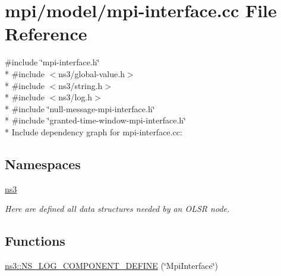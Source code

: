\hypertarget{mpi-interface_8cc}{}\section{mpi/model/mpi-\/interface.cc File Reference}
\label{mpi-interface_8cc}
{\ttfamily \#include \char`\"{}mpi-\/interface.\+h\char`\"{}}\\*
{\ttfamily \#include $<$ns3/global-\/value.\+h$>$}\\*
{\ttfamily \#include $<$ns3/string.\+h$>$}\\*
{\ttfamily \#include $<$ns3/log.\+h$>$}\\*
{\ttfamily \#include \char`\"{}null-\/message-\/mpi-\/interface.\+h\char`\"{}}\\*
{\ttfamily \#include \char`\"{}granted-\/time-\/window-\/mpi-\/interface.\+h\char`\"{}}\\*
Include dependency graph for mpi-\/interface.cc\+:
\subsection*{Namespaces}
\begin{DoxyCompactItemize}
\item 
 \hyperlink{namespacens3}{ns3}
\begin{DoxyCompactList}\small\item\em Here are defined all data structures needed by an O\+L\+SR node. \end{DoxyCompactList}\end{DoxyCompactItemize}
\subsection*{Functions}
\begin{DoxyCompactItemize}
\item 
\hyperlink{namespacens3_ac0ea8c5ee5f4cc923e252e3103122850}{ns3\+::\+N\+S\+\_\+\+L\+O\+G\+\_\+\+C\+O\+M\+P\+O\+N\+E\+N\+T\+\_\+\+D\+E\+F\+I\+NE} (\char`\"{}Mpi\+Interface\char`\"{})
\end{DoxyCompactItemize}
